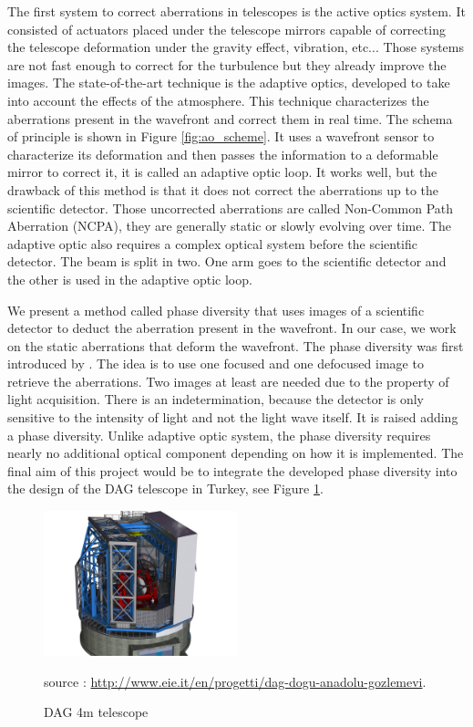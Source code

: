 The first system to correct aberrations in telescopes is the active optics system. It consisted of actuators placed under the telescope mirrors capable of correcting the telescope deformation under the gravity effect, vibration, etc... Those systems are not fast enough to correct for the turbulence but they already improve the images. The state-of-the-art technique is the adaptive optics, developed to take into account the effects of the atmosphere. This technique characterizes the aberrations present in the wavefront and correct them in real time. The schema of principle is shown in Figure \ref{fig:ao_scheme}. It uses a wavefront sensor to characterize its deformation and then passes the information to a deformable mirror to correct it, it is called an adaptive optic loop. It works well, but the drawback of this method is that it does not correct the aberrations up to the scientific detector. Those uncorrected aberrations are called Non-Common Path Aberration (NCPA), they are generally static or slowly evolving over time. The adaptive optic also requires a complex optical system before the scientific detector. The beam is split in two. One arm goes to the scientific detector and the other is used in the adaptive optic loop.

We present a method called phase diversity that uses images of a scientific detector to deduct the aberration present in the wavefront. In our case, we work on the static aberrations that deform the wavefront. The phase diversity was first introduced by \citet{Gonsalves_1982}. The idea is to use one focused and one defocused image to retrieve the aberrations. Two images at least are needed due to the property of light acquisition. There is an indetermination, because the detector is only sensitive to the intensity of light and not the light wave itself. It is raised adding a phase diversity. Unlike adaptive optic system, the phase diversity requires nearly no additional optical component depending on how it is implemented. The final aim of this project would be to integrate the developed phase diversity into the design of the DAG telescope in Turkey, see Figure \ref{fig:DAGtelescope}.

\begin{figure}
\begin{center}
\includegraphics[width=0.5\textwidth,angle=0]{Figures/DAGtelescope.jpg} \\
\caption{DAG 4m telescope} 
source : \url{http://www.eie.it/en/progetti/dag-dogu-anadolu-gozlemevi}.
\label{fig:DAGtelescope}
\end{center}
\end{figure}

